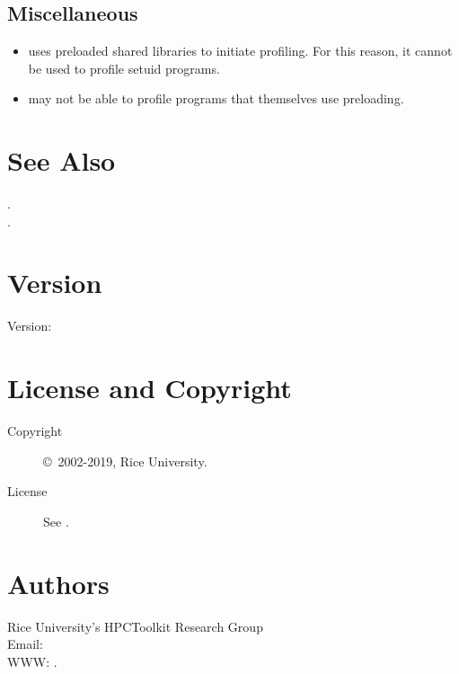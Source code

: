 \documentclass[english]{article}
\begin{document}
\subsection{Miscellaneous}

\begin{itemize}
  \item {} uses preloaded shared libraries to initiate profiling.  For this reason, it cannot be used to profile setuid programs.
  \item {} may not be able to profile programs that themselves use preloading.
\end{itemize}


\section{See Also}

.\\
.


\section{Version}

Version: \Version

\section{License and Copyright}

\begin{description}
\item[Copyright] \copyright\ 2002-2019, Rice University.
\item[License] See .
\end{description}

\section{Authors}

\noindent
Rice University's HPCToolkit Research Group \\
Email:  \\
WWW: .

\LatexManEnd
\end{document}
